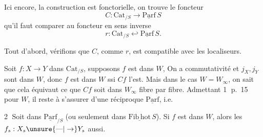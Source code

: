 
 

Ici encore, la construction est fonctorielle, on trouve le foncteur
\[ C:\mathrm{Cat}_{/S}\longrightarrow\underline{\mathrm{Parf}}\,S \]
qu'il faut comparer au foncteur en sens inverse
\[ r:\mathrm{Cat}_{/S}\hookleftarrow\underline{\mathrm{Parf}}\,S. \]

Tout d'abord, vérifions que $C$,  comme $r$, est compatible avec les  localiseurs.

Soit $f:X\to Y$ dans $\mathrm{Cat}_{/S}$, supposons $f$ est dans $W$,   On a commutativité 
et $j_X,j_Y$ sont dans $W$, donc $f$ est dans $W$ ssi $Cf$ l'est.  Mais dans le cas $W=W_\infty$, on sait que cela équivaut  ce que $Cf$ soit dans $W_\infty$ fibre par fibre. Admettant \textcircled{1} p.~15 pour $W$, il reste à s'assurer  d'une réciproque  $\underline{\mathrm{Parf}}$, i.e.

\textcircled{2} Soit
dans $\underline{\mathrm{Parf}}_{/S}$ (ou seulement dans $\underline{\mathrm{Fib}\,\mathrm{hot}}\,S$). Si $f$ est dans $W$, alors les $f_s:X_s\unsure{\text{---}|\to}Y_s$ aussi.

